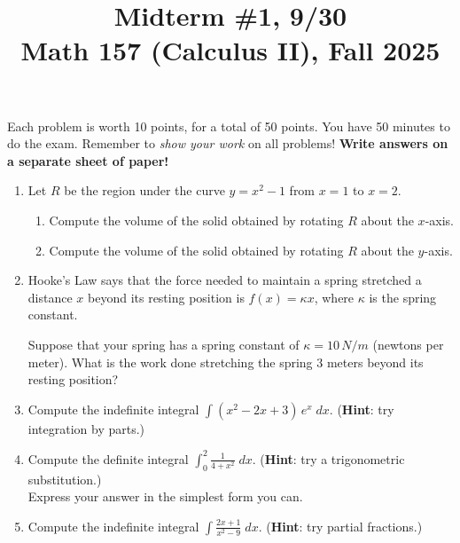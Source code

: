 \documentclass[11pt]{article}
\title{Midterm \#1, 9/30 \\ Math 157 (Calculus II), Fall 2025}
\date{}
\begin{document}
\maketitle

\thispagestyle{empty}

\vspace{-1cm}

Each problem is worth 10 points, for a total of 50 points. You have 50 minutes to do the exam. Remember to \emph{show your work} on all problems! {\bf Write answers on a separate sheet of paper!}

\begin{enumerate}
\item Let $R$ be the region under the curve $y=x^2-1$ from $x=1$ to $x=2$. \begin{enumerate}
\item Compute the volume of the solid obtained by rotating $R$ about the $x$-axis.
\item Compute the volume of the solid obtained by rotating $R$ about the $y$-axis.
\end{enumerate}

\item Hooke's Law says that the force needed to maintain a spring stretched a distance $x$ beyond its resting position is $f(x) = \kappa x$, where $\kappa$ is the spring constant. 

Suppose that your spring has a spring constant of $\kappa = 10 \, N/m$ (newtons per meter). What is the work done stretching the spring $3$ meters beyond its resting position?

\item Compute the indefinite integral $\displaystyle \int (x^2-2x+3) \, e^{x} \; dx$. ({\bf Hint}: try integration by parts.)

\item Compute the definite integral $\displaystyle \int_{0}^{2} \frac{1}{4+x^2} \; dx$. ({\bf Hint}: try a trigonometric substitution.) \\ Express your answer in the simplest form you can.

\item Compute the indefinite integral $\displaystyle \int \frac{2x+1}{x^2-9} \; dx$. ({\bf Hint}: try partial fractions.)

\end{enumerate}
\end{document}
